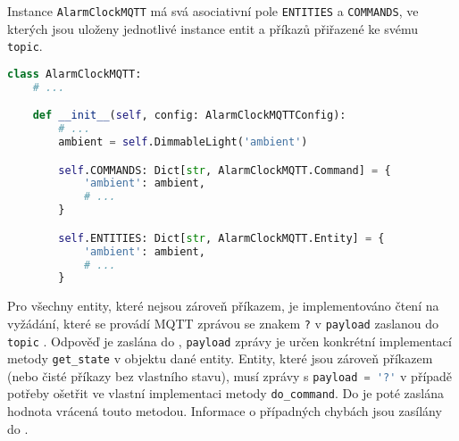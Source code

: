 Instance \texttt{AlarmClockMQTT} má svá asociativní pole
\texttt{ENTITIES} a \texttt{COMMANDS}, ve kterých jsou uloženy jednotlivé
instance entit a příkazů přiřazené ke svému \texttt{topic}.

\begin{lstlisting}[language=Python]
class AlarmClockMQTT:
    # ...

    def __init__(self, config: AlarmClockMQTTConfig):
        # ...
        ambient = self.DimmableLight('ambient')

        self.COMMANDS: Dict[str, AlarmClockMQTT.Command] = {
            'ambient': ambient,
            # ...
        }

        self.ENTITIES: Dict[str, AlarmClockMQTT.Entity] = {
            'ambient': ambient,
            # ...
        }
\end{lstlisting}

Pro všechny entity, které nejsou zároveň příkazem, je implementováno čtení na
vyžádání, které se provádí MQTT zprávou se znakem \texttt{?} v \texttt{payload}
zaslanou do \texttt{topic} . Odpověď je
zaslána do , \texttt{payload} zprávy je
určen konkrétní implementací metody \verb|get_state| v objektu dané entity.
Entity, které jsou zároveň příkazem (nebo čisté příkazy bez vlastního stavu),
musí zprávy s \lstinline[language=Python]{payload = '?'} v případě potřeby
ošetřit ve vlastní implementaci metody \verb|do_command|. Do
 je poté zaslána hodnota vrácená touto
metodou. Informace o případných chybách jsou zasílány do
.

